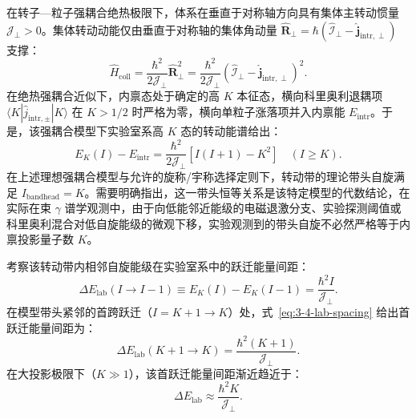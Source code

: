 在转子—粒子强耦合绝热极限下，体系在垂直于对称轴方向具有集体主转动惯量 $\mathcal{J}_\perp > 0$。集体转动动能仅由垂直于对称轴的集体角动量 $\hat{\mathbf{R}}_\perp = \hbar (\hat{\boldsymbol{\mathcal{I}}}_\perp - \hat{\mathbf{j}}_{\text{intr},\perp})$ 支撑：
\begin{equation}\label{eq:3-4-high-K-H}
\hat{H}_{\text{coll}} = \frac{\hbar^2}{2\mathcal{J}_\perp} \hat{\mathbf{R}}_\perp^2 = \frac{\hbar^2}{2\mathcal{J}_\perp} \left( \hat{\boldsymbol{\mathcal{I}}}_\perp - \hat{\mathbf{j}}_{\text{intr},\perp} \right)^2.
\end{equation}
在绝热强耦合近似下，内禀态处于确定的高 $K$ 本征态，横向科里奥利退耦项 $\langle K | \hat{j}_{\text{intr},\pm} | K \rangle$ 在 $K > 1/2$ 时严格为零，横向单粒子涨落项并入内禀能 $E_{\text{intr}}$。于是，该强耦合模型下实验室系高 $K$ 态的转动能谱给出：
\begin{equation}\label{eq:3-4-high-K-spectrum}
E_K(I) - E_{\text{intr}} = \frac{\hbar^2}{2\mathcal{J}_\perp} \left[ I(I+1) - K^2 \right] \quad (I \ge K).
\end{equation}
在上述理想强耦合模型与允许的旋称/宇称选择定则下，转动带的理论带头自旋满足 $I_{\text{bandhead}} = K$。需要明确指出，这一带头恒等关系是该特定模型的代数结论，在实际在束 $\gamma$ 谱学观测中，由于向低能邻近能级的电磁退激分支、实验探测阈值或科里奥利混合对低自旋能级的微观下移，实验观测到的带头自旋不必然严格等于内禀投影量子数 $K$。

考察该转动带内相邻自旋能级在实验室系中的跃迁能量间距：
\begin{equation}\label{eq:3-4-lab-spacing}
\Delta E_{\text{lab}}(I \to I-1) \equiv E_K(I) - E_K(I-1) = \frac{\hbar^2 I}{\mathcal{J}_\perp}.
\end{equation}
在模型带头紧邻的首跨跃迁（$I = K+1 \to K$）处，式~\eqref{eq:3-4-lab-spacing} 给出首跃迁能量间距为：
\begin{equation}\label{eq:3-4-first-lab-spacing}
\Delta E_{\text{lab}}(K+1 \to K) = \frac{\hbar^2 (K+1)}{\mathcal{J}_\perp}.
\end{equation}
在大投影极限下（$K \gg 1$），该首跃迁能量间距渐近趋近于：
\begin{equation}\label{eq:3-4-asymptotic-lab-spacing}
\Delta E_{\text{lab}} \approx \frac{\hbar^2 K}{\mathcal{J}_\perp}.
\end{equation}

